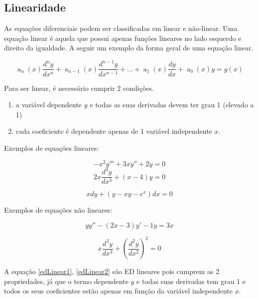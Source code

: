 \subsection[Linearidade]{Linearidade}
As equações diferenciais podem ser classificadas em linear e não-linear.
Uma equação linear é aquela que possui apenas funções lineares no lado esquerdo e direito da igualdade. A seguir um exemplo da forma geral de uma equação linear.
\begin{center}
\begin{equation} \label{formaGeral}
 \operatorname{a}_{n}(x) \dfrac{d^ny}{dx^n} + \operatorname{a}_{n-1}(x)\dfrac{d^{n-1}y}{dx^{n-1}} + ... + \operatorname{a}_{1}(x)\dfrac{dy}{dx} + \operatorname{a}_{0}(x)y = g(x) 
\end{equation}
\end{center}

Para ser linear, é necessário cumprir 2 condições. 
\begin{enumerate}
	\item{}a variável dependente $y$ e todas as suas derivadas devem ter grau 1 (elevado a 1)
	\item{}cada coeficiente é dependente apenas de 1 variável independente $x$.
\end{enumerate}

Exemplos de equações lineares: 

\begin{equation}
	\label{edLinear1}
   -x^2y''' + 3xy'' + 2y = 0  
\end{equation}
\begin{equation}
	\label{edLinear2}
  2x\frac{d^3y}{dx^3} + (x- 4)y = 0   
\end{equation}

\begin{equation}
	\label{edLinear3}
  xdy + (y - xy - e^x)dx = 0 
\end{equation}

Exemplos de equações não lineares: 

\begin{equation}
	\label{edNaoLinear1}
  yy'' - (2x -3)y' - 1y  = 3x   
\end{equation}

\begin{equation}
	\label{edNaoLinear2}
 x\frac{d^3y}{dx^3} + (\frac{d^2y}{dx^2})^2 = 0  
\end{equation}

 
A equação \ref{edLinear1}, \ref{edLinear2} são ED lineares pois cumprem as 2 propriedades, já que o termo dependente $y$ e todas suas derivadas tem grau 1 e todos os seus coeficientes estão apenas em função da variável independente $x$.

